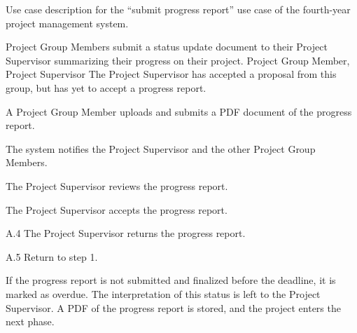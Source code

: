 \begin{table}
  \centering
  \caption{Use case description for the ``submit progress report'' use case of the fourth-year project management system.}
  \label{tbl:use-case-submit-progress-report}

  \begin{usecase}
    Project Group Members submit a status update document to their Project Supervisor summarizing their progress on their project.
    Project Group Member, Project Supervisor
    The Project Supervisor has accepted a proposal from this group, but has yet to accept a progress report.
    \ucnormal
    \begin{ucenum}
      \item A Project Group Member uploads and submits a PDF document of the progress report.
      \item The system notifies the Project Supervisor and the other Project Group Members.
      \item The Project Supervisor reviews the progress report.
      \item The Project Supervisor accepts the progress report.
    \end{ucenum}
    \begin{ucenum}
      \item [A.4] The Project Supervisor returns the progress report.
      \item [A.5] Return to step 1.
    \end{ucenum}
    If the progress report is not submitted and finalized before the deadline, it is marked as overdue. The interpretation of this status is left to the Project Supervisor.
    A PDF of the progress report is stored, and the project enters the next phase.
  \end{usecase}
\end{table}


